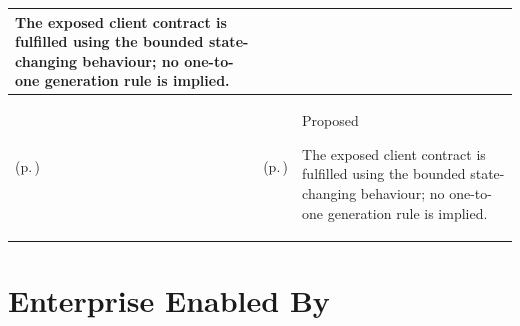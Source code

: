 \begin{longtable}{|>{\raggedright\arraybackslash}p{0.27\TableWidth}|>{\raggedright\arraybackslash}p{0.27\TableWidth}|>{\raggedright\arraybackslash}p{0.46\TableWidth}|}
The exposed client contract is fulfilled using the bounded state-changing behaviour; no one-to-one generation rule is implied.\\\hline
\nameref{service:authorised-research-information-export} (p.\,\pageref{service:authorised-research-information-export}) & \nameref{function:assemble-purpose-qualified-research-release} (p.\,\pageref{function:assemble-purpose-qualified-research-release}) & Proposed

The exposed client contract is fulfilled using the bounded state-changing behaviour; no one-to-one generation rule is implied.\\\hline
\end{longtable}\endgroup
\section{Enterprise Enabled By}
\begingroup\small\setlength{\TableWidth}{\dimexpr\linewidth-6\tabcolsep-4\arrayrulewidth\relax}
